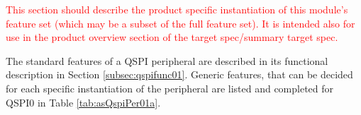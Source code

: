 \textcolor{red}{This section should describe the product specific instantiation of this module’s feature set (which may be a subset of the full feature set). It is intended also for use in the product overview section of the target spec/summary target spec.}

The standard features of a QSPI peripheral are described in its functional description in Section \ref{subsec:qspifunc01}. Generic features, that can be decided for each specific instantiation of the peripheral are listed and completed for QSPI0 in Table \ref{tab:asQspiPer01a}.
